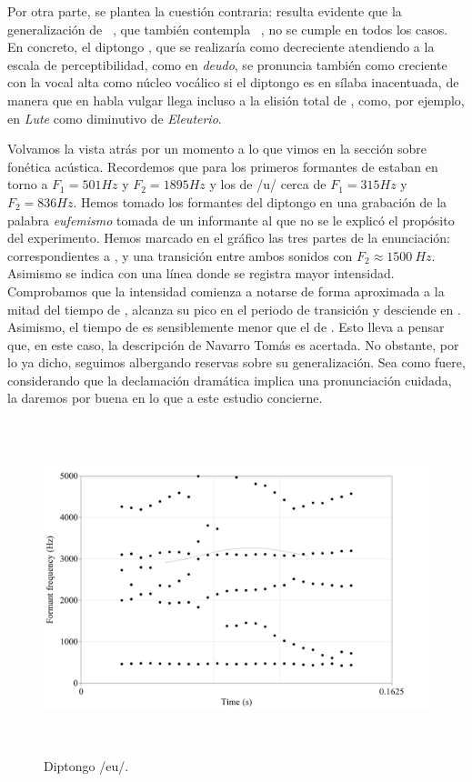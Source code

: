 Por otra parte, se plantea la cuestión contraria: resulta evidente que la generalización de \citeauthor{navarrotomas2004}~\parencite*[66]{navarrotomas2004}, que también contempla \citeauthor{quilis2019}~\parencite*[178-181]{quilis2019}, no se cumple en todos los casos. En concreto, el diptongo , que se realizaría como decreciente \ipa{[eu̯]} atendiendo a la escala de perceptibilidad, como en \textit{deudo}, se pronuncia también como creciente \ipa{[e̯u]} con la vocal alta  como núcleo vocálico si el diptongo es en sílaba inacentuada, de manera que en habla vulgar llega incluso a la elisión total de , como, por ejemplo, en \textit{Lute} como diminutivo de \textit{Eleuterio}.

Volvamos la vista atrás por un momento a lo que vimos en  la sección sobre fonética acústica. Recordemos que para los primeros formantes de  estaban en torno a $F_1 = 501 Hz$ y $F_2 = 1895 Hz$ y los de /u/ cerca de  $F_1 = 315 Hz$ y $F_2 = 836 Hz$. Hemos tomado los formantes del diptongo en una grabación de la palabra \textit{eufemismo} tomada de un informante al que no se le explicó el propósito del experimento. Hemos marcado en el gráfico las tres partes de la enunciación: correspondientes a ,  y una transición entre ambos sonidos con $F_2 \approx 1500\:Hz$. Asimismo se indica con una línea donde se registra mayor intensidad. Comprobamos que la intensidad comienza a notarse de forma aproximada a la mitad del tiempo de , alcanza su pico en el periodo de transición y desciende en . Asimismo, el tiempo de  es sensiblemente menor que el de . Esto lleva a pensar que, en este caso, la descripción de Navarro Tomás es acertada. No obstante, por lo ya dicho, seguimos albergando reservas sobre su generalización. Sea como fuere, considerando que la declamación dramática implica una pronunciación cuidada, la daremos por buena en lo que a este estudio concierne.

\begin{figure}[!ht]
	\centering
	\includegraphics[height = 9.7cm]{images/eu.png}
	\caption{Diptongo /eu/.}
	\label{fig:eu}
\end{figure}

